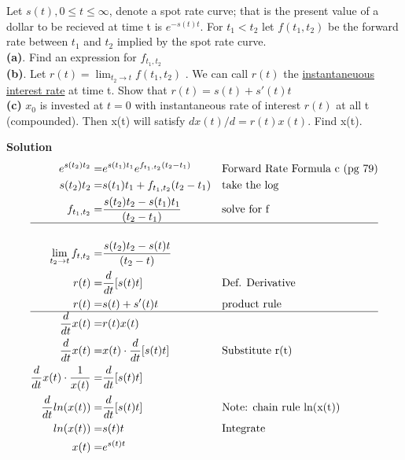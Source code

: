 \documentclass[12pt]{article}
\newenvironment{problem}[3][Problem]{\begin{trivlist}
\item[\hskip \labelsep {\bfseries #1}\hskip \labelsep {\bfseries #2.}]}{\end{trivlist}}
\begin{document}
\begin{problem}5. Let $s(t), 0 \leq t \leq \infty$, denote a spot rate curve; that is the present value of a dollar to be recieved at time t is $e^{-s(t)t}$. For $t_1 < t_2$ let $f(t_1,t_2)$ be the forward rate between $t_1$ and $t_2$ implied by the spot rate curve.\\
\textbf{(a)}. Find an expression for $f_{t_1,t_2}$\\
\textbf{(b)}. Let $r(t) = \lim_{t_2\to t} f(t_1,t_2)$ . We can call $r(t)$ the \underline{instantaneuous interest rate} at time t. Show that $r(t) = s(t) + s'(t)t$ \\
\textbf{(c)} $x_0$ is invested at $t=0$ with instantaneous rate of interest $r(t)$ at all t (compounded). Then x(t) will satisfy $dx(t)/d=r(t)x(t)$. Find x(t). 

\textbf{Solution} 
\begin{align*}
e^{s(t_2)t_2} =& e^{s(t_1)t_1}e^{f_{t_1,t_2}(t_2-t_1)} && \text{Forward Rate Formula c (pg 79)} \\
s(t_2)t_2 =& s(t_1)t_1 + f_{t_1,t_2}(t_2-t_1) && \text{take the log} \\
f_{t_1,t_2} =& \frac{s(t_2)t_2 -s(t_1)t_1}{(t_2-t_1)}  && \text{solve for f} \\
\hline \\
\lim_{t_2 \to t} f_{t,t_2} =& \frac{s(t_2)t_2 -s(t)t}{(t_2-t)}  \\
r(t)=& \frac{d}{dt}[s(t)t] && \text{Def. Derivative} \\
r(t)=& s(t) + s'(t)t && \text{product rule} \\
\hline
\frac{d}{dt}x(t) =&r(t)x(t) \\
\frac{d}{dt}x(t) =& x(t) \cdot\frac{d}{dt}[s(t)t] && \text{Substitute r(t)} \\
\frac{d}{dt}x(t) \cdot \frac{1}{x(t)} =&  \frac{d}{dt}[s(t)t] \\ 
\frac{d}{dt}ln(x(t)) =&  \frac{d}{dt}[s(t)t] && \text{Note: chain rule ln(x(t))} \\
ln(x(t)) =& s(t)t && \text{Integrate} \\
x(t) =& e^{s(t)t} 
\end{align*}


\end{problem}

\end{document}
